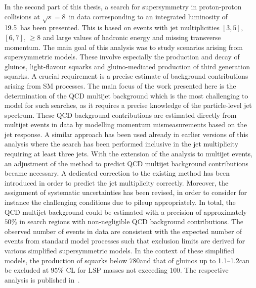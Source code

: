 In the second part of this thesis, a search for supersymmetry in proton-proton collisions at $\sqrt{s}=8$~\tev in data corresponding to an integrated luminosity of 19.5~\fbinv has been presented. This is based on events with jet multiplicities $[3, 5]$, $[6, 7]$, $\ge 8$ and large values of hadronic energy and missing transverse momentum. The main goal of this analysis was to study scenarios arising from supersymmetric models. These involve especially the production and decay of gluinos, light-flavour squarks and gluino-mediated production of third generation squarks. A crucial requirement is a precise estimate of background contributions arising from SM processes. The main focus of the work presented here is the determination of the QCD multijet background which is the most challenging to model for such searches, as it requires a precise knowledge of the particle-level jet spectrum. These QCD background contributions are estimated directly from multijet events in data by modelling momentum mismeasurements based on the jet response. A similar approach has been used already in earlier versions of this analysis where the search has been performed inclusive in the jet multiplicity requiring at least three jets. With the extension of the analysis to multijet events, an adjustment of the method to predict QCD multijet background contributions became necessary. A dedicated correction to the existing method has been introduced in order to predict the jet multiplicity correctly. Moreover, the assignment of systematic uncertainties has been revised, in order to consider for instance the challenging conditions due to pileup appropriately. In total, the QCD multijet background could be estimated with a precision of approximately $50\%$ in search regions with non-negligible QCD background contributions. The observed number of events in data are consistent with the expected number of events from standard model processes such that exclusion limits are derived for various simplified supersymmetric models. In the context of these simplified models, the production of squarks below 780\gev and that of gluinos up to 1.1--1.2\tev can be excluded at $95\%$ CL for LSP masses not exceeding 100\gev. The respective analysis is published in~\cite{Chatrchyan:2014lfa}. \\

